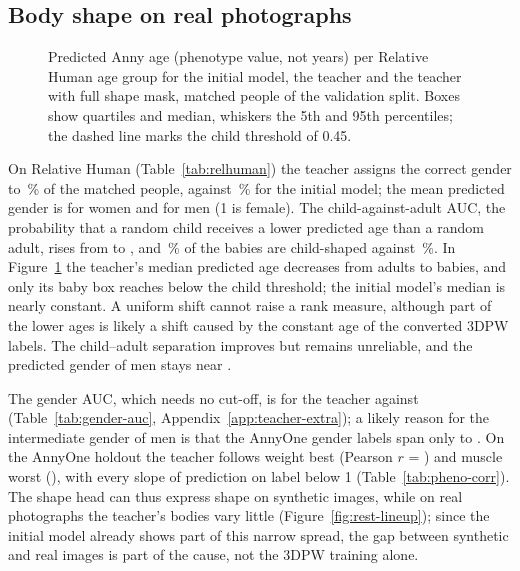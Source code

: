 \subsection{Body shape on real photographs}
\label{sec:res-teacher-shape}
\label{sec:res-rh}



\begin{figure}[!tbp]
\centering

\caption[Predicted Anny age per Relative Human age group]{Predicted Anny age (phenotype value, not years) per
Relative Human age group for the initial model, the teacher and the teacher with full shape mask, matched people of
the validation split. Boxes show quartiles and median, whiskers the 5th and 95th percentiles; the dashed line marks
the child threshold of 0.45.}
\label{fig:rh-age}
\end{figure}

On Relative Human (Table~\ref{tab:relhuman}) the teacher assigns the correct gender to \RHGenderFinal\,\% of the
matched people, against \RHGenderBase\,\% for the initial model; the mean predicted gender is \RHWomenGenderFinal{}
for women and \RHMenGenderFinal{} for men (1 is female). The child-against-adult AUC, the probability that a random
child receives a lower predicted age than a random adult, rises from \RHAUCBase{} to \RHAUCFinal, and
\RHBabiesBelowFinal\,\% of the babies are child-shaped against \RHBabiesBelowBase\,\%. In Figure~\ref{fig:rh-age} the
teacher's median predicted age decreases from adults to babies, and only its baby box reaches below the child
threshold; the initial model's median is nearly constant. A uniform shift cannot raise a rank measure, although part of the lower
ages is likely a shift caused by the constant age of the converted 3DPW labels. The child--adult separation improves
but remains unreliable, and the predicted gender of men stays near \RHMenGenderFinal.

The gender AUC, which needs no cut-off, is \RHGenderAUCFinal{} for the teacher against \RHGenderAUCBase{}
(Table~\ref{tab:gender-auc}, Appendix~\ref{app:teacher-extra}); a likely reason for the intermediate gender of men
is that the AnnyOne gender labels span only \HoldGenderLabelMin{} to \HoldGenderLabelMax. On the AnnyOne holdout the
teacher follows weight best (Pearson $r$ = \PhenoRFinalWeight) and muscle worst (\PhenoRFinalMuscle), with every
slope of prediction on label below 1 (Table~\ref{tab:pheno-corr}). The shape head can thus express shape on
synthetic images, while on real photographs the teacher's bodies vary little (Figure~\ref{fig:rest-lineup}); since
the initial model already shows part of this narrow spread, the gap between synthetic and real images is part of the
cause, not the 3DPW training alone.

